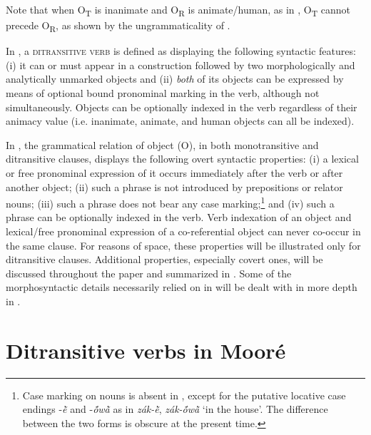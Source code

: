 \documentclass[output=paper]{langsci/langscibook}
\begin{document}
Note that when O\textsubscript{T} is inanimate and O\textsubscript{R} is animate/human, as in , O\textsubscript{T} cannot precede O\textsubscript{R}, as shown by the ungrammaticality of .

\z

\largerpage[-1]
In , a \textsc{ditransitive verb} is defined as displaying the following syntactic features: (i) it can or must appear in a construction followed by two morphologically and analytically unmarked objects and (ii) \textit{both} of its objects can be expressed by means of optional bound pronominal marking in the verb, although not simultaneously. Objects can be optionally indexed in the verb regardless of their animacy value (i.e. inanimate, animate, and human objects can all be indexed).

In , the grammatical relation of object (O), in both monotransitive and ditransitive clauses, displays the following overt syntactic properties: (i) a lexical or free pronominal expression of it occurs immediately after the verb or after another object; (ii) such a phrase is not introduced by prepositions or relator nouns; (iii) such a phrase does not bear any case marking;\footnote{Case marking on nouns is absent in , except for the putative locative case endings -\textit{\`{ẽ}} and -\textit{\'{õ}w\`{ã}} as in \textit{zák-\`{ẽ}}, \textit{zák-\'{õ}w\`{ã}} `in the house'. The difference between the two forms is obscure at the present time.} and (iv) such a phrase can be optionally indexed in the verb. Verb indexation of an object and lexical/free pronominal expression of a co-referential object can never co-occur in the same clause. For reasons of space, these properties will be illustrated only for ditransitive clauses. Additional properties, especially covert ones, will be discussed throughout the paper and summarized in . Some of the morphosyntactic details necessarily relied on in   will be dealt with in more depth in .

\section{Ditransitive verbs in Mooré}\label{§3:ditransitive.pacchiarotti}
\end{document}

